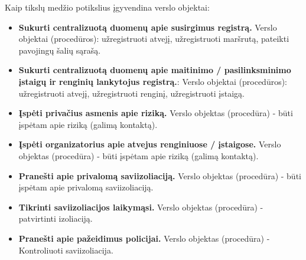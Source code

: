 \documentclass{VUMIFPSkursinis}
\begin{document}
\noindent Kaip tikslų medžio potikslius įgyvendina verslo objektai:
\begin{itemize}
	\item \textbf{Sukurti centralizuotą duomenų apie susirgimus registrą.} Verslo objektai (procedūros):  užregistruoti atvejį, užregistruoti maršrutą, pateikti pavojingų šalių sąrašą.
	\item \textbf{Sukurti centralizuotą duomenų apie maitinimo / pasilinksminimo įstaigų ir renginių lankytojus registrą.}: Verslo objektai (procedūros): užregistruoti atvejį, užregistruoti renginį, užregistruoti įstaigą.
	\item \textbf{Įspėti privačius asmenis apie riziką.} Verslo objektas (procedūra) - būti įspėtam apie riziką (galimą kontaktą).
	\item \textbf{Įspėti organizatorius apie atvejus renginiuose / įstaigose.} Verslo objektas (procedūra) - būti įspėtam apie riziką (galimą kontaktą).	
	\item \textbf{Pranešti apie privalomą saviizoliaciją.} Verslo objektas (procedūra) - būti įspėtam apie privalomą saviizoliaciją.
	\item \textbf{Tikrinti saviizoliacijos laikymąsi.}	Verslo objektas (procedūra) - patvirtinti izoliaciją.
	\item \textbf{Pranešti apie pažeidimus policijai.}	Verslo objektas (procedūra) - Kontroliuoti saviizoliacija.
\end{itemize}
\end{document}
